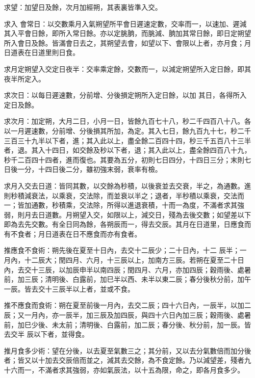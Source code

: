 \begin{pinyinscope}
 求望：加望日及餘，次月加經朔，其表裏皆準入交。



 求入
 會常日：以交數乘月入氣朔望所平會日遲速定數，交率而一，以速加、遲減其入平會日餘，即所入常日餘。亦以定朓朒，而朓減、朒加其常日餘，即日定朔望所入會日及餘。皆滿會日去之，其朔望去會，如望以下、會限以上者，亦月食；月日道表在日道里則日食。



 求月定朔望入交定日夜半：交率乘定餘，交數而一，以減定朔望所入定日餘，即其夜半所定入。



 求次日：以每日遲速數，分前增、分後損定朔所入定日餘，以加
 其日，各得所入定日及餘。



 求次月：加定朔，大月二日，小月一日，皆餘九百七十八，秒二千四百八十八。各以一月遲速數，分前增、分後損其所加，為定。其入七日，餘九百九十七，秒二千三百三十九半以下者，進；其入此以上，盡全餘二百四十四，秒三千五百八十三半者，退。其入十四日，如交餘及秒以下者，退；其入此以上，盡全餘四百八十九，秒千二百四十四者，進而復也。其要為五分，初則七日四分，十四日三分；末則七日後一分，十四日後二分，雖初強末弱，衰率有檢。



 求月入交去日道：皆同其數，以交餘為秒積，以後衰並去交衰，半之，為通數。進則秒積減衰法，以乘衰，交法除，而並衰以半之；退者，半秒積以乘衰，交法而一；皆加通數，秒積乘，交法除，所得以進退衰積，十而一為度，不滿者求其強弱，則月去日道數。月朔望入交，如限以上，減交日，殘為去後交數；如望差以下即為去先交數。有全日同為餘，各朔辰而一，得去交辰。其月在日道里，日應食而有不食者；月日道表在日不應食而亦有食者。



 推應食不食術：朔先後在夏至十日內，去交十二辰少；二十日內，十二
 辰半；一月內，十二辰大；閏四月、六月，十三辰以上，加南方三辰。若朔在夏至二十日內，去交十三辰，以加辰申半以南四辰；閏四月、六月，亦加四辰；穀雨後、處暑前，加三辰；清明後、白露前，加巳半以西、未半以東二辰；春分後秋分前，加午一辰。皆去交十三辰半以上者，並或不食。



 推不應食而食術：朔在夏至前後一月內，去交二辰；四十六日內，一辰半，以加二辰；又一月內，亦一辰半，加三辰及加四辰，與四十六日內加三辰；穀雨後、處暑前，加巳少後、未太前；清明後、白露前，加二辰；春分後、秋分前，加一辰。皆去交半
 辰以下者，並得食。



 推月食多少術：望在分後，以去夏至氣數三之；其分前，又以去分氣數倍而加分後者；皆又以十加去交辰倍而並之，減其去交餘，為不食定餘。乃以減望差，殘者九十六而一，不滿者求其強弱，亦如氣辰法，以十五為限，命之，即各月食多少。




\end{pinyinscope}
